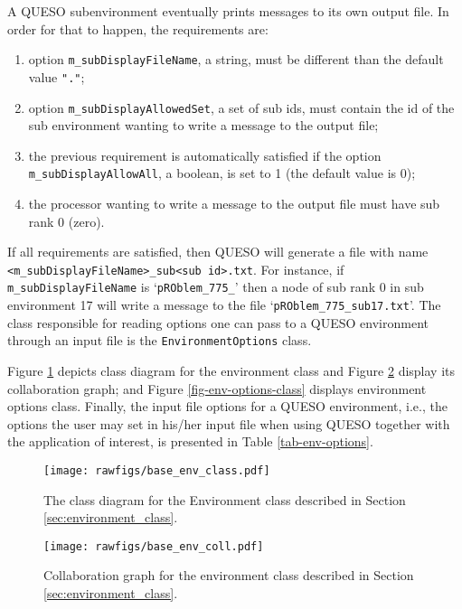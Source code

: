 A QUESO subenvironment eventually prints messages to its own output file. In order for that to happen, the requirements are:
\begin{enumerate}
 \item option \verb+m_subDisplayFileName+, a string, must be different than the default value \verb+"."+;
\item  option \verb+m_subDisplayAllowedSet+, a set of sub ids, must contain the id of the sub environment wanting to write a message to the output file;
\item  the previous requirement is automatically satisfied if the option \verb+m_subDisplayAllowAll+, a boolean, is set to 1 (the default value is 0);
\item  the processor wanting to write a message to the output file must have sub rank 0 (zero).
\end{enumerate}

If all requirements are satisfied, then QUESO will generate a file with name \linebreak
\verb+<m_subDisplayFileName>_sub<sub id>.txt+.   For instance, if \verb+m_subDisplayFileName+ is `\verb+pROblem_775_+' then a node of sub rank 0 in sub environment 17 will write a message to the file `\verb+pROblem_775_sub17.txt+'. The class responsible for reading options one can pass to a QUESO environment through an input file is the \verb+EnvironmentOptions+ class.

Figure \ref{fig-env-class} depicts class diagram for the environment class and Figure \ref{fig-env-coll} display its collaboration graph; and Figure  \ref{fig-env-options-class} displays environment options class. %
 Finally, the input file options for a QUESO environment, i.e., the options the user may set in his/her input file when using QUESO together with the application of interest, is presented in Table \ref{tab-env-options}.

\begin{figure}[!hp]
\centering
\texttt{[image: rawfigs/base\_env\_class.pdf]}
\vspace*{-1.2cm}
\caption{The class diagram for the {Environment} class described in Section \ref{sec:environment_class}.}
\label{fig-env-class}
\end{figure}

\begin{figure}[!hp]
\centering
\texttt{[image: rawfigs/base\_env\_coll.pdf]}
\vspace*{-1.cm}
\caption{Collaboration graph for the environment class described in Section \ref{sec:environment_class}.}
\label{fig-env-coll}
\end{figure}

